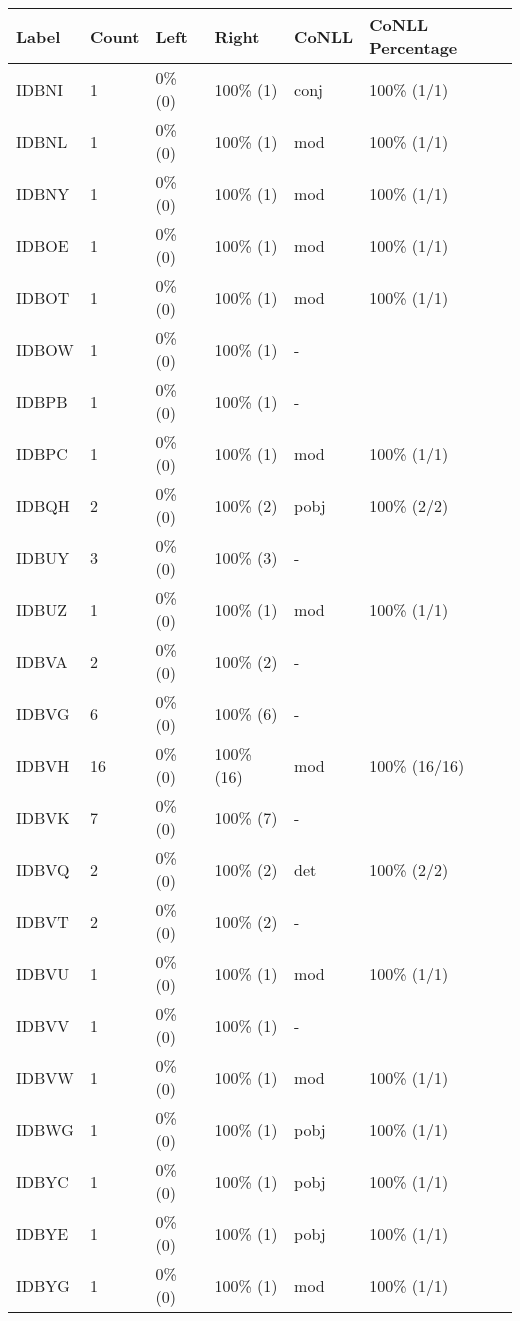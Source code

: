 \begin{figure*}
\begin{tabular}{|l|l|l|l||l|l|}
\hline
Label & Count & Left & Right & CoNLL & CoNLL Percentage\\ 
\hline
 IDBNI & 1 & 0\% (0) & 100\% (1) & conj & 100\% (1/1) \\ 
\hline
 IDBNL & 1 & 0\% (0) & 100\% (1) & mod & 100\% (1/1) \\ 
\hline
 IDBNY & 1 & 0\% (0) & 100\% (1) & mod & 100\% (1/1) \\ 
\hline
 IDBOE & 1 & 0\% (0) & 100\% (1) & mod & 100\% (1/1) \\ 
\hline
 IDBOT & 1 & 0\% (0) & 100\% (1) & mod & 100\% (1/1) \\ 
\hline
 IDBOW & 1 & 0\% (0) & 100\% (1) & - &  \\ 
\hline
 IDBPB & 1 & 0\% (0) & 100\% (1) & - &  \\ 
\hline
 IDBPC & 1 & 0\% (0) & 100\% (1) & mod & 100\% (1/1) \\ 
\hline
 IDBQH & 2 & 0\% (0) & 100\% (2) & pobj & 100\% (2/2) \\ 
\hline
 IDBUY & 3 & 0\% (0) & 100\% (3) & - &  \\ 
\hline
 IDBUZ & 1 & 0\% (0) & 100\% (1) & mod & 100\% (1/1) \\ 
\hline
 IDBVA & 2 & 0\% (0) & 100\% (2) & - &  \\ 
\hline
 IDBVG & 6 & 0\% (0) & 100\% (6) & - &  \\ 
\hline
 IDBVH & 16 & 0\% (0) & 100\% (16) & mod & 100\% (16/16) \\ 
\hline
 IDBVK & 7 & 0\% (0) & 100\% (7) & - &  \\ 
\hline
 IDBVQ & 2 & 0\% (0) & 100\% (2) & det & 100\% (2/2) \\ 
\hline
 IDBVT & 2 & 0\% (0) & 100\% (2) & - &  \\ 
\hline
 IDBVU & 1 & 0\% (0) & 100\% (1) & mod & 100\% (1/1) \\ 
\hline
 IDBVV & 1 & 0\% (0) & 100\% (1) & - &  \\ 
\hline
 IDBVW & 1 & 0\% (0) & 100\% (1) & mod & 100\% (1/1) \\ 
\hline
 IDBWG & 1 & 0\% (0) & 100\% (1) & pobj & 100\% (1/1) \\ 
\hline
 IDBYC & 1 & 0\% (0) & 100\% (1) & pobj & 100\% (1/1) \\ 
\hline
 IDBYE & 1 & 0\% (0) & 100\% (1) & pobj & 100\% (1/1) \\ 
\hline
 IDBYG & 1 & 0\% (0) & 100\% (1) & mod & 100\% (1/1) \\ 

\end{tabular}
\end{figure*}
